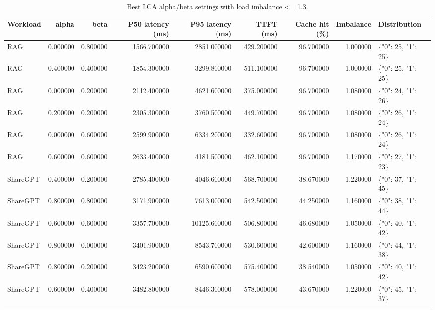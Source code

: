\begin{table}
\caption{Best LCA alpha/beta settings with load imbalance <= 1.3.}
\label{tab:exp3-best-balanced}
\begin{tabular}{lrrrrrrrl}
\toprule
Workload & alpha & beta & P50 latency (ms) & P95 latency (ms) & TTFT (ms) & Cache hit (\%) & Imbalance & Distribution \\
\midrule
RAG & 0.000000 & 0.800000 & 1566.700000 & 2851.000000 & 429.200000 & 96.700000 & 1.000000 & \{"0": 25, "1": 25\} \\
RAG & 0.400000 & 0.400000 & 1854.300000 & 3299.800000 & 511.100000 & 96.700000 & 1.000000 & \{"0": 25, "1": 25\} \\
RAG & 0.000000 & 0.200000 & 2112.400000 & 4621.600000 & 375.000000 & 96.700000 & 1.080000 & \{"0": 24, "1": 26\} \\
RAG & 0.200000 & 0.200000 & 2305.300000 & 3760.500000 & 449.700000 & 96.700000 & 1.080000 & \{"0": 26, "1": 24\} \\
RAG & 0.000000 & 0.600000 & 2599.900000 & 6334.200000 & 332.600000 & 96.700000 & 1.080000 & \{"0": 26, "1": 24\} \\
RAG & 0.600000 & 0.600000 & 2633.400000 & 4181.500000 & 462.100000 & 96.700000 & 1.170000 & \{"0": 27, "1": 23\} \\
ShareGPT & 0.400000 & 0.200000 & 2785.400000 & 4046.600000 & 568.700000 & 38.670000 & 1.220000 & \{"0": 37, "1": 45\} \\
ShareGPT & 0.800000 & 0.800000 & 3171.900000 & 7613.000000 & 542.500000 & 44.250000 & 1.160000 & \{"0": 38, "1": 44\} \\
ShareGPT & 0.600000 & 0.600000 & 3357.700000 & 10125.600000 & 506.800000 & 46.680000 & 1.050000 & \{"0": 40, "1": 42\} \\
ShareGPT & 0.800000 & 0.000000 & 3401.900000 & 8543.700000 & 530.600000 & 42.600000 & 1.160000 & \{"0": 44, "1": 38\} \\
ShareGPT & 0.800000 & 0.200000 & 3423.200000 & 6590.600000 & 575.400000 & 38.540000 & 1.050000 & \{"0": 40, "1": 42\} \\
ShareGPT & 0.600000 & 0.400000 & 3482.800000 & 8446.300000 & 578.000000 & 43.670000 & 1.220000 & \{"0": 45, "1": 37\} \\
\bottomrule
\end{tabular}
\end{table}
